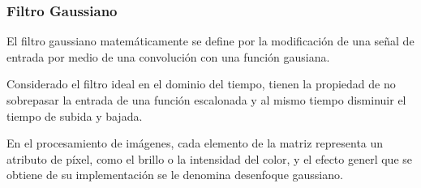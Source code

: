 	\subsubsection*{Filtro Gaussiano}
		\hfill\break
		\justifying
		El filtro gaussiano matemáticamente se define por la modificación de una señal de entrada por medio de una convolución con una función gausiana.
		
		\hfill\break
		\justifying
		Considerado el filtro ideal en el dominio del tiempo, tienen la propiedad de no sobrepasar la entrada de una función escalonada y al mismo tiempo disminuir el tiempo de subida y bajada.
		
		\hfill\break
		\justifying
		En el procesamiento de imágenes, cada elemento de la matriz representa un atributo de píxel, como el brillo o la intensidad del color, y el efecto generl que se obtiene de su implementación se le denomina desenfoque gaussiano.
		
